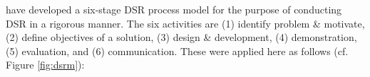 \begin{comment}
	\begin{table}[t]
		\caption[Design Science Research Guidelines]{Design Science Research Guidelines adapted from \citet[p. 83]{Hevner2007}}
		\label{tab:dsrg}
		\centering
		\begin{tabular}{L{.25\textwidth}L{.65\textwidth}}
				\toprule 
				\small \textbf{Guideline} &\small  \textbf{Description} \\ \midrule
				\small G1: Design as an Artifact & 
				\small Design-science research must produce a viable artifact in the form of a construct, a model, a method, or an instantiation.\\ \midrule
				\small G2: Problem Relevance&
				\small The objective of design-science research is to develop technology-based solutions to important and relevant business problems.\\ \midrule
				\small G3: Design Evaluation&
				\small The utility, quality, and efficacy of a design artifact must be rigorously demonstrated via well-executed evaluation methods.\\ \midrule
				\small G4: Research Contributions&
				\small Effective design-science research must provide clear and verifiable contributions in the areas of the design artifact, design foundations, and/or design methodologies.\\ \midrule
				\small G5: Research Rigor&
				\small Design-science research relies upon the application of rigorous methods in both the construction and evaluation of the design artifact.\\ \midrule
				\small G6: Design as a Search Process&
				\small The search for an effective artifact requires utilizing available means to reach desired ends while satisfying laws in the problem environment.\\ \midrule
				\small G7: Communication of Research&
				\small Design-science research must be presented effectively both to technology-oriented as well as management-oriented audiences.\\ \bottomrule
		\end{tabular}
	\end{table}
\end{comment}

\citet[pp. 52-56]{Peffers2007} have developed a six-stage \ac{DSR} process model for the purpose of conducting \ac{DSR} in a rigorous manner. The six activities are (1) identify problem \& motivate, (2) define objectives of a solution, (3) design \& development, (4) demonstration, (5) evaluation, and (6) communication. These were applied here as follows (cf. Figure \ref{fig:dsrm}):

